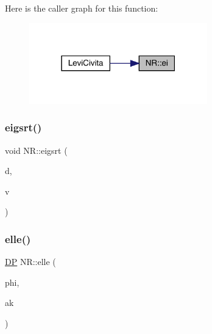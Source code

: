 Here is the caller graph for this function\+:\nopagebreak
\begin{figure}[H]
\begin{center}
\leavevmode
\includegraphics[width=219pt]{da/d46/namespaceNR_a28d2f7fc957866378bc8d49df208d5bc_icgraph}
\end{center}
\end{figure}
\mbox{\label{namespaceNR_a47b470822fede3df423c4b65fd109d46}} 
\subsubsection{\texorpdfstring{eigsrt()}{eigsrt()}}
{\footnotesize\ttfamily void N\+R\+::eigsrt (\begin{DoxyParamCaption}\item[{\mbox{\hyperlink{namespaceNR_ab293e06a6bf799d8a7ed932b6852bcb8}{Vec\+\_\+\+I\+O\+\_\+\+DP}} \&}]{d,  }\item[{\mbox{\hyperlink{namespaceNR_ad1513aa4697878ed3bff0b8b3c9dd910}{Mat\+\_\+\+I\+O\+\_\+\+DP}} \&}]{v }\end{DoxyParamCaption})}

\mbox{\label{namespaceNR_a1762d8c42e9423b8290b196da5ed3b88}} 
\subsubsection{\texorpdfstring{elle()}{elle()}}
{\footnotesize\ttfamily \mbox{\hyperlink{namespaceNR_af6ff762dd605ff477b8e52387253a02a}{DP}} N\+R\+::elle (\begin{DoxyParamCaption}\item[{const \mbox{\hyperlink{namespaceNR_af6ff762dd605ff477b8e52387253a02a}{DP}}}]{phi,  }\item[{const \mbox{\hyperlink{namespaceNR_af6ff762dd605ff477b8e52387253a02a}{DP}}}]{ak }\end{DoxyParamCaption})}

\mbox{\label{namespaceNR_a1571206bbdfafab7d95c23d356084050}} 
